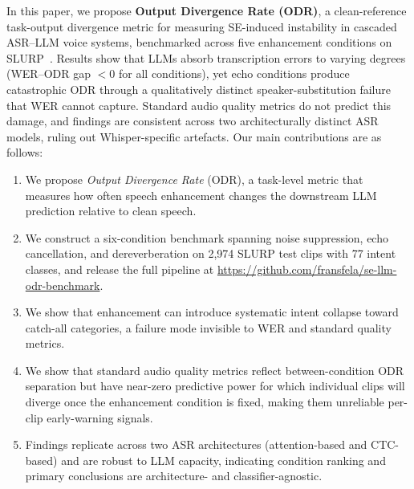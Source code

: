\documentclass[11pt]{article}
\begin{document}
In this paper, we propose \textbf{Output Divergence Rate (ODR)},
a clean-reference task-output divergence metric for measuring
SE-induced instability in cascaded ASR--LLM voice systems,
benchmarked across five enhancement
conditions on SLURP~\citep{bastianelli2020slurp}.
Results show that LLMs absorb transcription errors to varying
degrees (WER--ODR gap $< 0$ for all conditions), yet echo
conditions produce catastrophic ODR through a qualitatively
distinct speaker-substitution failure that WER cannot capture.
Standard audio quality metrics do not predict this damage,
and findings are consistent across two architecturally distinct ASR
models, ruling out Whisper-specific artefacts. Our main contributions are as follows:



\begin{enumerate}[itemsep=1.5pt, topsep=2pt, parsep=0pt, partopsep=0pt]
\item We propose \emph{Output Divergence Rate} (ODR), a
  task-level metric that measures how often speech enhancement
  changes the downstream LLM prediction relative to clean speech.
\item We construct a six-condition benchmark spanning noise
  suppression, echo cancellation, and dereverberation on
  2{,}974 SLURP test clips with 77 intent classes, and release
  the full pipeline at \href{https://github.com/fransfela/se-llm-odr-benchmark}{https://github.com/fransfela/se-llm-odr-benchmark}.
\item We show that enhancement can introduce systematic intent
  collapse toward catch-all categories, a failure mode
  invisible to WER and standard quality metrics.
\item We show that standard audio quality metrics reflect
  between-condition ODR separation but have near-zero predictive
  power for which individual clips will diverge once the enhancement
  condition is fixed, making them unreliable per-clip early-warning
  signals.
\item Findings replicate across two ASR architectures
  (attention-based and CTC-based) and are robust to LLM capacity, %
  indicating condition ranking and primary conclusions are
  architecture- and classifier-agnostic.
\end{enumerate}
\end{document}
